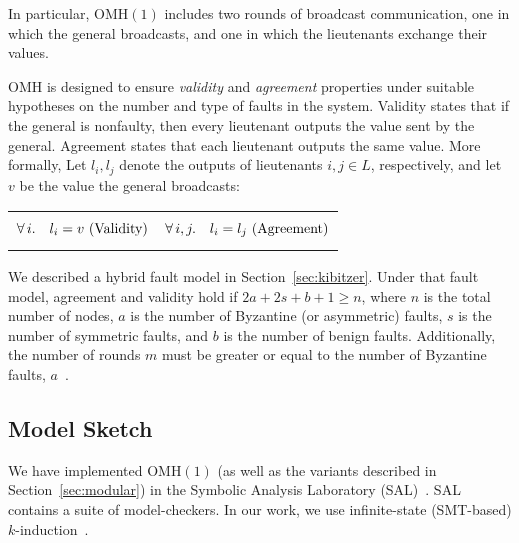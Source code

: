 \documentclass{llncs/llncs}
\newcommand{\OMH}{\ensuremath{\mathrm{OMH}}\xspace}
\begin{document}
\noindent
In particular, $\OMH(1)$ includes two rounds of broadcast communication, one in which the general broadcasts, and one in which the lieutenants exchange their values.

$\OMH$ is designed to ensure \emph{validity} and \emph{agreement} properties under suitable hypotheses on the number and type of faults in the system. Validity states that if the general is nonfaulty, then every lieutenant outputs the value sent by the general. Agreement states that each lieutenant outputs the same value. More formally, Let $l_i, l_j$ denote the outputs of lieutenants $i, j \in L$, respectively, and let $v$ be the value the general broadcasts:
\noindent
\begin{center}
\begin{tabular}{l|l}
\begin{minipage}[t]{0.5\linewidth}
\begin{equation*}
    \forall \,i. \quad l_i = v \textnormal{ (Validity)}
\end{equation*}
\end{minipage}&
\begin{minipage}[t]{0.5\linewidth}
\begin{equation*}
    \forall \,i, j. \quad l_i = l_j \textnormal{ (Agreement)}
\end{equation*}
\end{minipage}
\end{tabular}
\end{center}
%

%
%

We described a hybrid fault model in Section~\ref{sec:kibitzer}. Under that fault model, agreement and validity hold if $2a+2s+b+1 \geq n$, where $n$ is the total number of nodes, $a$ is the number of Byzantine (or asymmetric) faults, $s$ is the number of symmetric faults, and $b$ is the number of benign faults. Additionally, the number of rounds $m$ must be greater or equal to the number of Byzantine faults, $a$~\cite{Lincoln-Rushby,hybrid}.


\subsection{Model Sketch}\label{sec:sketch}

We have implemented $\OMH(1)$ (as well as the variants described in Section~\ref{sec:modular}) in the Symbolic Analysis Laboratory (SAL)~\cite{SAL}. SAL contains a suite of model-checkers. In our work, we use infinite-state (SMT-based) $k$-induction~\cite{cal}.
\end{document}

